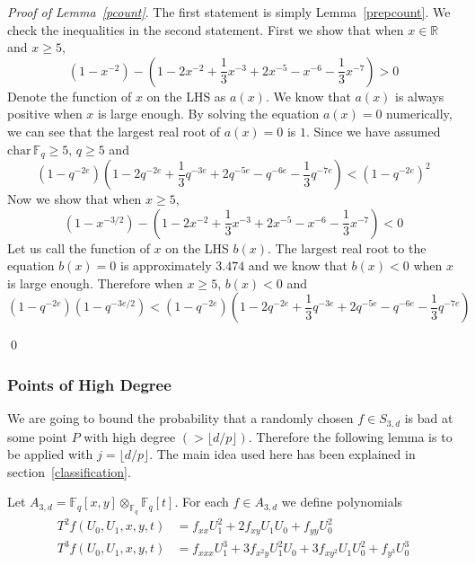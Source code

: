 \documentclass[12pt]{article}
\theoremstyle{plain}
\theoremstyle{definition}
\newcommand{\IF}{\mathbb{F}}
\newcommand{\sB}{\mathcal{B}}
\newcommand\tensor{{\otimes}}
\newcommand\union{\bigcup}
\newcommand{\<}{\langle}
\renewcommand{\>}{\rangle}
\begin{document}
\noindent \textit{Proof of Lemma~\ref{pcount}}. The first statement is simply Lemma~\ref{prepcount}. We check the inequalities in the second statement. First we show that when $x \in \mathbb{R}$ and $x \ge 5 $, 
$$ (1 - x^{-2}) - (1 - 2 x^{-2} + \frac{1}{3} x^{-3} + 2 x^{-5} - x^{-6} - \frac{1}{3} x^{-7}) > 0 $$ 
Denote the function of $x$ on the LHS as $a(x)$. We know that $a(x)$ is always positive when $x$ is large enough. By solving the equation $a(x) = 0$ numerically, we can see that the largest real root of $a(x) = 0$ is $1$. Since we have assumed $\mathrm{char} \, \IF_q \ge 5$, $q \ge 5$ and 
$$ (1 - q^{-2e})(1 - 2q^{-2e} + \frac{1}{3} q^{-3e} + 2 q^{-5e} - q^{-6e} - \frac{1}{3} q^{-7e}) < (1 - q^{-2e})^2 $$
Now we show that when $x \ge 5$, 
$$ (1 - x^{-3/2}) - (1 - 2 x^{-2} + \frac{1}{3} x^{-3} + 2 x^{-5} - x^{-6} - \frac{1}{3} x^{-7}) < 0 $$
Let us call the function of $x$ on the LHS $b(x)$. The largest real root to the equation $b(x) = 0$ is approximately $3.474$ and we know that $b(x) < 0$ when $x$ is large enough. Therefore when $x \ge 5$, $b(x) < 0$ and 
$$ (1 - q^{-2e}) (1 - q^{-3e/2}) < (1 - q^{-2e})(1 - 2q^{-2e} + \frac{1}{3} q^{-3e} + 2 q^{-5e} - q^{-6e} - \frac{1}{3} q^{-7e})  $$

\qed



\subsubsection{Points of High Degree}
We are going to bound the probability that a randomly chosen $f \in S_{3, d}$ is bad at some point $P$ with high degree $(> \lfloor d/p \rfloor)$. Therefore the following lemma is to be applied with $j = \lfloor d/p \rfloor$. The main idea used here has been explained in section~\ref{classification}.

Let $A_{3, d} = \IF_q[x, y]\tensor_{\IF_q} \IF_q[t]$. 
For each $f \in A_{3, d}$ we define polynomials
\begin{align*}
T^2 f(U_0, U_1, x, y, t) &= f_{xx}U_1^2 + 2f_{xy} U_1 U_0 + f_{yy} U_0^2 \\
T^3 f(U_0, U_1, x, y, t) &= f_{xxx} U_1^3 + 3 f_{x^2 y} U_1^2 U_0 + 3 f_{x y^2} U_1 U_0^2 + f_{y^3} U_0^3 
\end{align*}
\end{document}
